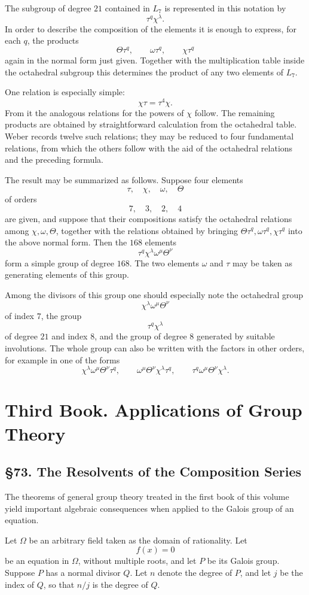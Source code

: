 \documentclass[11pt,a4paper]{book}
\newcommand{\webersection}[2]{\clearpage\section*{\S #1. #2}}
\newcommand{\booktitle}[1]{\clearpage\chapter*{#1}}
\begin{document}
The subgroup of degree \(21\) contained in \(L_7\) is represented in this notation by
\[
 \tau^q\chi^\lambda .
\]
In order to describe the composition of the elements it is enough to express, for each \(q\), the products
\[
 \Theta\tau^q,\qquad \omega\tau^q,\qquad \chi\tau^q
\]
again in the normal form just given.  Together with the multiplication table inside the octahedral subgroup this determines the product of any two elements of \(L_7\).

One relation is especially simple:
\[
 \chi\tau=\tau^4\chi.
\]
From it the analogous relations for the powers of \(\chi\) follow.  The remaining products are obtained by straightforward calculation from the octahedral table.  Weber records twelve such relations; they may be reduced to four fundamental relations, from which the others follow with the aid of the octahedral relations and the preceding formula.

The result may be summarized as follows.  Suppose four elements
\[
 \tau,\quad \chi,\quad \omega,\quad \Theta
\]
of orders
\[
 7,\quad 3,\quad 2,\quad 4
\]
are given, and suppose that their compositions satisfy the octahedral relations among \(\chi,\omega,\Theta\), together with the relations obtained by bringing
\(\Theta\tau^q,\omega\tau^q,\chi\tau^q\) into the above normal form.  Then the \(168\) elements
\[
 \tau^q\chi^\lambda\omega^\mu\Theta^\nu
\]
form a simple group of degree \(168\).  The two elements \(\omega\) and \(\tau\) may be taken as generating elements of this group.

Among the divisors of this group one should especially note the octahedral group
\[
 \chi^\lambda\omega^\mu\Theta^\nu
\]
of index \(7\), the group
\[
 \tau^q\chi^\lambda
\]
of degree \(21\) and index \(8\), and the group of degree \(8\) generated by suitable involutions.  The whole group can also be written with the factors in other orders, for example in one of the forms
\[
 \chi^\lambda\omega^\mu\Theta^\nu\tau^q,\qquad
 \omega^\mu\Theta^\nu\chi^\lambda\tau^q,\qquad
 \tau^q\omega^\mu\Theta^\nu\chi^\lambda .
\]

\booktitle{Third Book. Applications of Group Theory}

\webersection{73}{The Resolvents of the Composition Series}

The theorems of general group theory treated in the first book of this volume yield important algebraic consequences when applied to the Galois group of an equation.

Let \(\Omega\) be an arbitrary field taken as the domain of rationality.  Let
\[
 f(x)=0
\]
be an equation in \(\Omega\), without multiple roots, and let \(P\) be its Galois group.  Suppose \(P\) has a normal divisor \(Q\).  Let \(n\) denote the degree of \(P\), and let \(j\) be the index of \(Q\), so that \(n/j\) is the degree of \(Q\).
\end{document}
